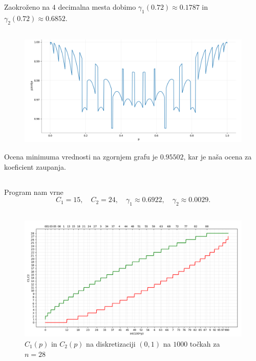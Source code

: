 \documentclass[ letterpaper, titlepage, fleqn]{article}
\begin{document}
\subsection{}
Zaokroženo na $4$ decimalna mesta dobimo $\gamma_1(0.72) \approx 0.1787$ in $\gamma_2(0.72) \approx 0.6852$.

\subsection{}
\begin{center}
\begin{figure}[h]
\begin{center}
\includegraphics[width=15cm]{graphics/Pokritje.png}
\end{center}
\end{figure}
\end{center}
Ocena minimuma vrednosti na zgornjem grafu je $0.95502$, kar je naša ocena za koeficient zaupanja.

\subsection{}
Program nam vrne
$$C_1 = 15, \quad C_2 = 24, \quad \gamma_1 \approx 0.6922, \quad \gamma_2 \approx 0.0029.$$

\subsection{}
\begin{center}
\begin{figure}[h]
\begin{center}
\includegraphics[width=15cm]{graphics/C1C2_28.png}
\caption{$C_1(p)$ in $C_2(p)$  na diskretizaciji $(0,1)$ na $1000$ točkah za $n=28$}
\end{center}
\end{figure}
\end{center}
\end{document}
